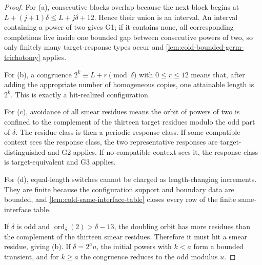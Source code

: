 \documentclass[11pt]{article}
\begin{document}
\begin{proof}
For (a), consecutive blocks overlap because the next block begins at
\(L+(j+1)\delta\le L+j\delta+12\).  Hence their union is an interval.  An
interval containing a power of two gives G1; if it contains none, all
corresponding completions live inside one bounded gap between consecutive
powers of two, so only finitely many target-response types occur and
\cref{lem:cold-bounded-germ-trichotomy} applies.

For (b), a congruence \(2^k\equiv L+r\pmod\delta\) with \(0\le r\le12\) means
that, after adding the appropriate number of homogeneous copies, one attainable
length is \(2^k\).  This is exactly a hit-realized configuration.

For (c), avoidance of all smear residues means the orbit of powers of two is
confined to the complement of the thirteen target residues modulo the odd
part of \(\delta\).  The residue class is then a periodic response class.  If some
compatible context sees the response class, the two representative responses are
target-distinguished and G2 applies.  If no compatible context sees it, the
response class is target-equivalent and G3 applies.

For (d), equal-length switches cannot be charged as length-changing
increments.  They are finite because the configuration support and boundary data are
bounded, and \cref{lem:cold-same-interface-table} closes every row of the
finite same-interface table.

If \(\delta\) is odd and \(\operatorname{ord}_{\delta}(2)>\delta-13\), the
doubling orbit has more residues than the complement of the thirteen smear
residues.  Therefore it must hit a smear residue, giving (b).  If
\(\delta=2^a u\), the initial powers with \(k<a\) form a bounded transient, and
for \(k\ge a\) the congruence reduces to the odd modulus \(u\).
\end{proof}
\end{document}
